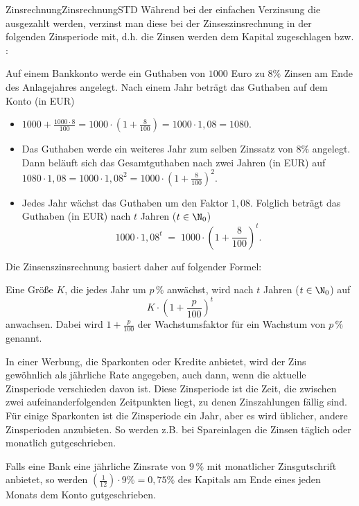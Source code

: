 \begin{MXContent}{Zinsrechnung}{Zinsrechnung}{STD}
Während bei der einfachen Verzinsung die  ausgezahlt werden, verzinst man diese bei der Zinseszinsrechnung in der folgenden Zinsperiode mit,
d.h. die Zinsen werden dem Kapital zugeschlagen bzw. :

\begin{MExample}
Auf einem Bankkonto werde ein Guthaben von $1000$ Euro zu $8\%$ Zinsen am Ende des Anlagejahres angelegt. Nach einem Jahr beträgt das Guthaben auf dem Konto (in EUR)
\begin{itemize}
\item{$1000+\frac{1000\cdot 8}{100}=1000\cdot \left(1+\frac{8}{100} \right)=1000\cdot 1,08=1080$.}
\item{Das Guthaben werde ein weiteres Jahr zum selben Zinssatz von $8\%$ angelegt. Dann beläuft sich das Gesamtguthaben nach zwei Jahren (in EUR) auf
$1080\cdot 1,08=1000\cdot 1,08^{2}=1000\cdot \left( 1+\frac{8}{100}\right)^{2}$.}
\item{Jedes Jahr wächst das Guthaben um den Faktor $1,08$. Folglich beträgt das Guthaben (in EUR) nach $t$ Jahren ($t\in\N_0$)
$$
1000\cdot 1,08^{t} \; =\; 1000\cdot \left( 1+\frac{8}{100}\right)^{t}.
$$}
\end{itemize}
\end{MExample}

Die Zinsenszinsrechnung basiert daher auf folgender Formel:

\begin{MInfo}
Eine Größe $K$, die jedes Jahr um $p\,\%$ anwächst, wird nach $t$ Jahren ($t\in \N_0$) auf
$$
K\cdot \left( 1+ \frac{p}{100}\right)^{t}
$$
anwachsen. Dabei wird $1+\frac{p}{100}$ der Wachstumsfaktor für ein Wachstum von $p\,\%$ genannt.
\end{MInfo}

In einer Werbung, die Sparkonten oder Kredite anbietet, wird der Zins gewöhnlich als jährliche Rate angegeben, auch dann,
wenn die aktuelle Zinsperiode verschieden davon ist. Diese Zinsperiode ist die Zeit, die zwischen zwei aufeinanderfolgenden Zeitpunkten liegt, zu denen Zinszahlungen fällig sind.
Für einige Sparkonten ist die Zinsperiode ein Jahr, aber es wird üblicher, andere Zinsperioden anzubieten.
So werden z.B. bei Spareinlagen die Zinsen täglich oder monatlich gutgeschrieben.

Falls eine Bank eine jährliche Zinsrate von $9\,\%$ mit monatlicher Zinsgutschrift anbietet, so werden $\left(\frac{1}{12} \right)\cdot 9\% =0,75\%$ des Kapitals am
Ende eines jeden Monats dem Konto gutgeschrieben. 


\end{MXContent}
